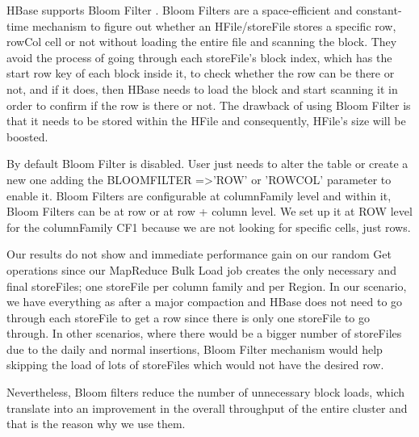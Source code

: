 \begin{itemize}
HBase supports Bloom Filter \cite{bloom1970space}. Bloom Filters are a space-efficient and constant-time mechanism to figure out whether an HFile/storeFile stores a specific row, rowCol cell or not without loading the entire file and scanning the block. They avoid the process of going through each storeFile's block index, which has the start row key of each block inside it, to check whether the row can be there or not, and if it does, then HBase needs to load the block and start scanning it in order to confirm if the row is there or not. The drawback of using Bloom Filter is that it needs to be stored within the HFile and consequently, HFile's size will be boosted. 
\par
By default Bloom Filter is disabled. User just needs to alter the table or create a new one adding the BLOOMFILTER =\textgreater 'ROW' or 'ROWCOL' parameter to enable it. Bloom Filters are configurable at columnFamily level and within it, Bloom Filters can be at row or at row + column level. We set up it at ROW level for the columnFamily CF1 because we are not looking for specific cells, just rows.

\bigskip

Our results do not show and immediate performance gain on our random Get operations since our MapReduce Bulk Load job creates the only necessary and final storeFiles; one storeFile per column family and per Region. In our scenario, we have everything as after a major compaction and HBase does not need to go through each storeFile to get a row since there is only one storeFile to go through. In other scenarios, where there would be a bigger number of storeFiles due to the daily and normal insertions, Bloom Filter mechanism would help skipping the load of lots of storeFiles which would not have the desired row.
\par
Nevertheless, Bloom filters reduce the number of unnecessary block loads, which translate into an improvement in the overall throughput of the entire cluster and that is the reason why we use them.



 


\end{itemize}











